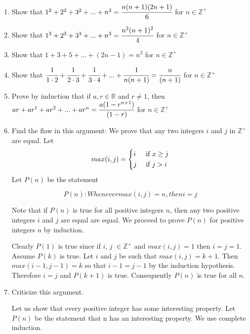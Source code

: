 \documentclass[10pt,letterpaper]{article}
\begin{document}
\begin{enumerate}
  \item Show that $1^2 + 2^2 + 3^2 + . . . + n^2 = \cfrac{n(n+1)(2n+1)}{6}$ for $n \in \mathbb{Z}^+$
  
  \item Show that $1^3 + 2^3 + 3^3 + . . . + n^3 = \cfrac{n^2(n+1)^2}{4}$ for $n \in \mathbb{Z}^+$
  
  \item Show that $1 + 3 + 5 + . . . + (2n -1) = n^2$ for $n \in \mathbb{Z}^+$
  
  \item Show that $\cfrac{1}{1 \cdot 2} + \cfrac{1}{2 \cdot 3} + \cfrac{1}{3 \cdot 4} + . . . + \cfrac[align]{1}{n(n+1)} = \cfrac{n}{(n+1)}$ for $n \in \mathbb{Z}^+$
  
  \item Prove by induction that if $a, r  \in \mathbb{R}$ and $r \neq 1$, then
      $ar + ar^1 + ar^2 + . . . + ar^n = \cfrac{a(1-r^{n+1})}{(1-r)}$ for $n \in \mathbb{Z}^+$
  
  \item Find the flaw in this argument:
  We prove that any two integers $i$ and $j$ in $\mathbb{Z}^+$ are equal. Let
    \[
      max(i,j) =
      \begin{dcases}
        i & \text{ if } x \ge j\\
        j & \text{ if } j > i
      \end{dcases}
    \]
    Let $P(n)$ be the statement
    
    \[
        P(n): Whenever max(i,j) = n, then i=j
    \]    
      
    Note that if $P(n)$ is true for all positive integers $n$, then any two positive integers $i$ and $j$ are equal are equal. We proceed to prove $P(n)$ for positive integers $n$ by induction.
  
    Clearly $P(1)$ is true since if $i$, $j$ $\in \mathbb{Z}^+$ and $max(i,j)=1$ then $i=j=1$. Assume $P(k)$ is true. Let $i$ and $j$ be such that $max(i,j) = k+1$. Then $max(i-1,j-1) = k$ so that $i-1 = j-1$ by the induction hypothesis. Therefore $i=j$ and $P(k+1)$ is true. Consequently $P(n)$ is true for all $n$.
  
  \item Criticize this argument.
  
  Let us show that every positive integer has some interesting property. Let $P(n)$ be the statement that n has an interesting property. We use complete induction.
  

\end{enumerate}
\end{document}
